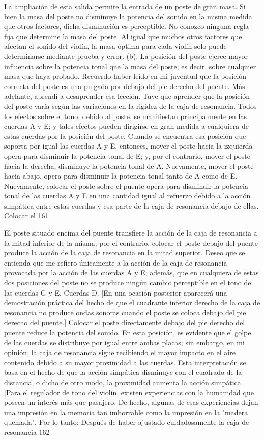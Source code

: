 La ampliación de esta salida permite la entrada de un poste de gran masa. Si bien la masa del poste no disminuye la potencia del sonido en la misma medida que otros factores, dicha disminución es perceptible. No conozco ninguna regla fija que determine la masa del poste. Al igual que muchos otros factores que afectan el sonido del violín, la masa óptima para cada violín solo puede determinarse mediante prueba y error.
(b). La posición del poste ejerce mayor influencia sobre la potencia tonal que la masa del poste; es decir, sobre cualquier masa que haya probado. Recuerdo haber leído en mi juventud que la posición correcta del poste es una pulgada por debajo del pie derecho del puente. Más adelante, aprendí a desaprender esa lección. Tuve que aprender que la posición del poste varía según las variaciones en la rigidez de la caja de resonancia. Todos los efectos
sobre el tono, debido al poste, se manifiestan principalmente en las cuerdas A y E; y tales efectos pueden dirigirse en gran medida a cualquiera de estas cuerdas por la posición del poste. Cuando se encuentra esa posición que soporta por igual las cuerdas A y E, entonces, mover el poste hacia la izquierda opera para disminuir la potencia tonal de E; y, por el contrario, mover el poste hacia la derecha, disminuye la potencia tonal de A. Nuevamente, mover el poste hacia abajo, opera para disminuir la potencia tonal tanto de A como de E. Nuevamente, colocar el poste sobre el puente opera para disminuir la potencia tonal de las cuerdas A y E en una cantidad igual al refuerzo debido a la acción simpática entre estas cuerdas y esa parte de la caja de resonancia debajo de ellas. Colocar el
161

El poste situado encima del puente transfiere la acción de la caja de resonancia a la mitad inferior de la misma; por el contrario, colocar el poste debajo del puente produce la acción de la caja de resonancia en la mitad superior. Deseo que se entienda que me refiero únicamente a la acción de la caja de resonancia provocada por la acción de las cuerdas A y E; además, que en cualquiera de estas dos posiciones del poste no se produce ningún cambio perceptible en el tono de las cuerdas G y E.
Cuerdas D.
[En una ocasión posterior aparecerá una demostración práctica del hecho de que el cuadrante inferior derecho de la caja de resonancia no produce ondas sonoras cuando el poste se coloca debajo del pie derecho del puente.]
Colocar el poste directamente debajo del pie derecho del puente reduce la potencia del sonido. En esta posición, es evidente que el golpe de las cuerdas se distribuye por igual entre ambas placas; sin embargo, en mi opinión, la caja de resonancia sigue recibiendo el mayor impacto en el aire contenido debido a su mayor proximidad a las cuerdas. Esta interpretación se basa en el hecho de que la acción simpática disminuye con el cuadrado de la distancia, o dicho de otro modo, la proximidad aumenta la acción simpática.
[Para el regulador de tono del violín, existen experiencias con la humanidad que poseen un interés más que pasajero. De hecho, algunas de esas experiencias dejan una impresión en la memoria tan imborrable como la impresión en la "madera quemada". Por lo tanto: Después de haber ajustado cuidadosamente la caja de resonancia
162

